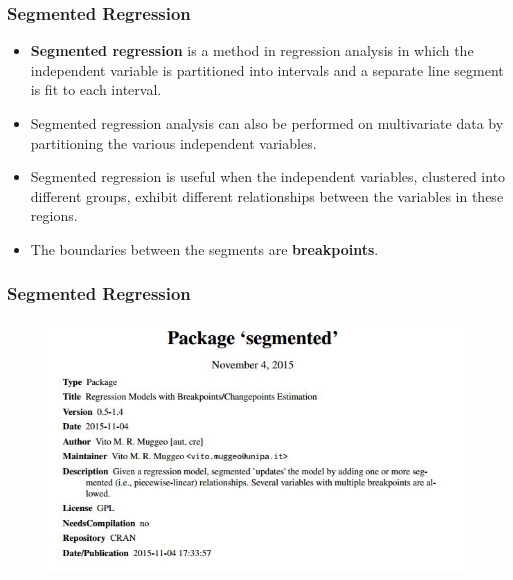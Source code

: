 \documentclass{beamer}
\begin{document}
\begin{frame}
			\frametitle{Segmented Regression}
			\large
			\begin{itemize}
		\item	\textbf{Segmented regression} is a method in regression analysis in which the independent variable is partitioned into intervals and a separate line segment is fit to each interval. 
			
		\item	Segmented regression analysis can also be performed on multivariate data by partitioning the various independent variables. \item Segmented regression is useful when the independent variables, clustered into different groups, exhibit different relationships between the variables in these regions. 
		\item The boundaries between the segments are \textbf{breakpoints}.
%			
			\end{itemize}

\end{frame}
\begin{frame}
		\frametitle{Segmented Regression}
		\large
	\begin{figure}
\centering
\includegraphics[width=1.1\linewidth]{images/CRAN-segmented}


\end{figure}

\end{frame}
\end{document}
